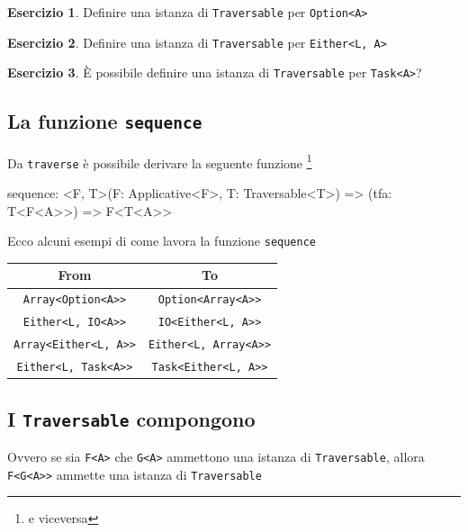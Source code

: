 \documentclass[12pt]{article}
\theoremstyle{definition}
\newtheorem{exercise}{Esercizio}[section]
\newenvironment{code}
  {\vspace{0.5cm} \VerbatimEnvironment\begin{typescriptcode}}
  {\end{typescriptcode} \vspace{0.2cm}}
\begin{document}
\begin{exercise}
Definire una istanza di \texttt{Traversable} per \texttt{Option<A>}
\end{exercise}

\begin{exercise}
Definire una istanza di \texttt{Traversable} per \texttt{Either<L, A>}
\end{exercise}

\begin{exercise}
È possibile definire una istanza di \texttt{Traversable} per \texttt{Task<A>}?
\end{exercise}

\subsection{La funzione \texttt{sequence}}

Da \texttt{traverse} è possibile derivare la seguente funzione \footnote{e viceversa}

\begin{code}
sequence: <F, T>(F: Applicative<F>, T: Traversable<T>) =>
  (tfa: T<F<A>>) => F<T<A>>
\end{code}

Ecco alcuni esempi di come lavora la funzione \texttt{sequence}

\begin{center}
\bgroup
\def\arraystretch{1.5}
\begin{tabular}{ |c|c| }
\hline
From & To \\
\hline
\texttt{Array<Option<A>>} & \texttt{Option<Array<A>>} \\
\hline
\texttt{Either<L, IO<A>>} & \texttt{IO<Either<L, A>>} \\
\hline
\texttt{Array<Either<L, A>>} & \texttt{Either<L, Array<A>>} \\
\hline
\texttt{Either<L, Task<A>>} & \texttt{Task<Either<L, A>>} \\
\hline
\end{tabular}
\egroup
\end{center}

\subsection{I \texttt{Traversable} compongono}

Ovvero se sia \texttt{F<A>} che \texttt{G<A>} ammettono una istanza di \texttt{Traversable}, allora \texttt{F<G<A>>} ammette una istanza di \texttt{Traversable}
\end{document}
